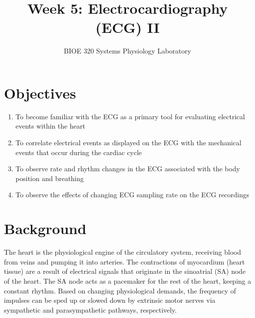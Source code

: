 \documentclass{article}
\title{Week 5: Electrocardiography (ECG) II}
\author{BIOE 320 Systems Physiology Laboratory}
\date{}
\begin{document}
\large
\maketitle

\section*{Objectives}
\begin{enumerate}
	\item To become familiar with the ECG as a primary tool for evaluating electrical events within the heart
	\item To correlate electrical events as displayed on the ECG with the mechanical events that occur during the cardiac cycle
	\item To observe rate and rhythm changes in the ECG associated with the body position and breathing
	\item To observe the effects of changing ECG sampling rate on the ECG recordings
\end{enumerate}

\section*{Background}
The heart is the physiological engine of the circulatory system, receiving blood from veins and pumping it into arteries. The contractions of myocardium (heart tissue) are a result of electrical signals that originate in the sinoatrial (SA) node of the heart. The SA node acts as a pacemaker for the rest of the heart, keeping a constant rhythm. Based on changing physiological demands, the frequency of impulses can be sped up or slowed down by extrinsic motor nerves via sympathetic and parasympathetic pathways, respectively.
\end{document}

